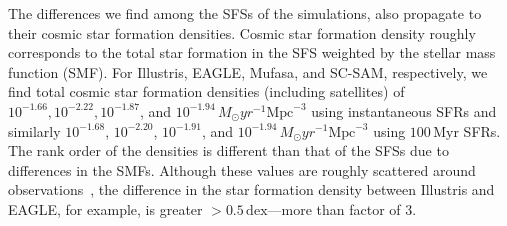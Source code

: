 \documentclass[tighten, preprint]{aastex62}
\newcommand{\todo}[1]{{\bf \textcolor{red}{ #1}}}
\begin{document}

{\color{red}
The differences we find among the SFSs of the simulations, also propagate to their 
cosmic star formation densities. Cosmic star formation density roughly corresponds to the total 
star formation in the SFS weighted by the stellar mass function (SMF). For Illustris,
EAGLE, {\sc Mufasa}, and SC-SAM, respectively, we find total cosmic star formation 
densities (including satellites) of 
$10^{-1.66}, 10^{-2.22}, 10^{-1.87}$, and $10^{-1.94}\,M_\odot yr^{-1} \mathrm{Mpc}^{-3}$ 
using instantaneous SFRs and similarly 
$10^{-1.68}$, $10^{-2.20}$, $10^{-1.91}$, and $10^{-1.94}\,M_\odot yr^{-1} \mathrm{Mpc}^{-3}$ 
using $100\,\mathrm{Myr}$ SFRs. The rank order of the densities is different than that of the 
SFSs due to differences in the SMFs. Although these 
values are roughly scattered around observations~\citep{madau2014}, the difference 
in the star formation density between Illustris and EAGLE, for example, is greater 
$>0.5\,\mathrm{dex}$---more than factor of 3.}
\end{document}
